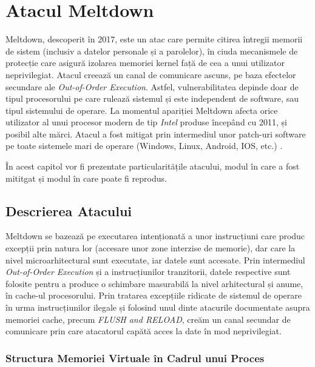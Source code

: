\chapter{Atacul Meltdown}

Meltdown, descoperit în 2017, este un atac care permite citirea întregii
memorii de sistem (inclusiv a datelor personale și a parolelor), în ciuda
mecanismele de protecție care asigură izolarea memoriei kernel față de cea a unui
utilizator neprivilegiat. Atacul creează un canal de comunicare ascuns, pe baza
efectelor secundare ale \emph{Out-of-Order Execution}. Astfel, vulnerabilitatea
depinde doar de tipul procesorului pe care rulează sistemul și este independent
de software, sau tipul sistemului de operare. La momentul apariției Meltdown
afecta orice utilizator al unui procesor modern de tip \emph{Intel} produse 
începând cu 2011, și posibil alte mărci. Atacul a fost mitigat prin intermediul
unor patch-uri software pe toate sistemele mari de operare (Windows, Linux, 
Android, IOS, etc.) \cite{meltdown2018}.

În acest capitol vor fi prezentate particularitățile atacului, modul în care a
fost mititgat și modul în care poate fi reprodus.

\section{Descrierea Atacului}

Meltdown se bazează pe executarea intenționată a unor instrucțiuni care produc
excepții prin natura lor (accesare unor zone interzise de memorie), dar care la
nivel microarhitectural sunt executate, iar datele sunt accesate. Prin
intermediul \emph{Out-of-Order Execution} și a instrucțiunilor tranzitorii,
datele respective sunt folosite pentru a produce o schimbare masurabilă la
nivel arhitectural și anume, în cache-ul procesorului. Prin tratarea excepțiile
ridicate de sistemul de operare în urma instrucțiunilor ilegale și folosind
unul dinte atacurile documentate asupra memoriei cache, precum \emph{FLUSH and
RELOAD}, creăm un canal secundar de comunicare prin care atacatorul capătă
acces la date în mod neprivilegiat.

\subsection{Structura Memoriei Virtuale în Cadrul unui Proces}

